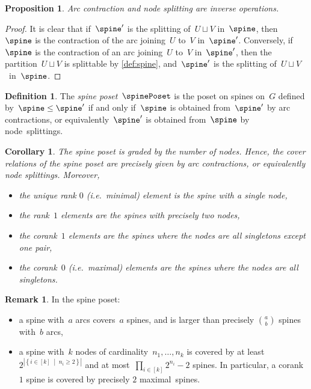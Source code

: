 \documentclass{amsart}
\newtheorem{corollary}[theorem]{Corollary}
\newtheorem{proposition}[theorem]{Proposition}
\theoremstyle{definition}
\newtheorem{definition}[theorem]{Definition}
\newtheorem{remark}[theorem]{Remark}
\newcommand{\set}[2]{\left\{ #1 \;\middle|\; #2 \right\}} %
\newcommand{\ie}{\textit{i.e.}~} %
\newcommand{\darkblue}{\color{darkblue}} %
\newcommand{\defn}[1]{\textsl{\darkblue #1}} %
\begin{document}
\begin{proposition}
  \label{prop:contractionSplitting}
  Arc contraction and node splitting are inverse operations.
\end{proposition}

\begin{proof}
  It is clear that if~$\spine'$ is the splitting of~$U \sqcup V$ in~$\spine$, then~$\spine$ is the contraction of the arc joining~$U$ to~$V$ in~$\spine'$.
  Conversely, if~$\spine$ is the contraction of an arc joining~$U$ to~$V$ in~$\spine'$, then the partition~$U \sqcup V$ is splittable by \cref{def:spine}, and~$\spine'$ is the splitting of~$U \sqcup V$~in~$\spine$.
\end{proof}

\begin{definition}
  The \defn{spine poset}~$\spinePoset$ is the poset on spines on~$G$ defined by~$\spine \le \spine'$ if and only if~$\spine$ is obtained from~$\spine'$ by arc contractions, or equivalently~$\spine'$ is obtained from~$\spine$ by node~splittings.
\end{definition}

\begin{corollary} 
  The spine poset is graded by the number of nodes.
  Hence, the cover relations of the spine poset are precisely given by arc contractions, or equivalently node splittings.
  Moreover,
  \begin{itemize}
    \item the unique rank $0$ (\ie minimal) element is the spine with a single node, 
    \item the rank~$1$ elements are the spines with precisely two nodes, 
    \item the corank~$1$ elements are the spines where the nodes are all singletons except one pair,
    \item the corank~$0$ (\ie maximal) elements are the spines where the nodes are all singletons.
  \end{itemize}
\end{corollary}

\begin{remark}
  In the spine poset:
  \begin{itemize}
    \item a spine with~$a$ arcs covers~$a$ spines, and is larger than precisely $\binom{a}{b}$ spines with~$b$ arcs,
    \item a spine with~$k$ nodes of cardinality~$n_1, \dots, n_k$ is covered by at least~$2^{|\set{i \in [k]}{n_i \ge 2}|}$ and at most~$\prod_{i \in [k]} 2^{n_i}-2$ spines. In particular, a corank~$1$ spine is covered by precisely $2$ maximal~spines.
  \end{itemize}
\end{remark}
\end{document}
